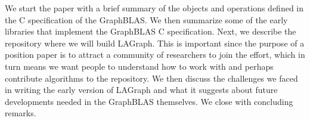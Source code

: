 We start the paper with a brief summary of the objects and operations defined in
the C specification of the GraphBLAS.  We then  summarize some of the 
early libraries that implement the GraphBLAS C specification.  Next, we describe
the repository where we will build LAGraph.  This is important since the
purpose of a position paper is to attract a community of researchers to join the effort,
which in turn means we want people to understand how to work with and perhaps contribute 
algorithms to the repository.  We then discuss the challenges we faced in writing the 
early version of LAGraph and what it suggests about future developments needed in the
GraphBLAS themselves. We close with concluding remarks.














